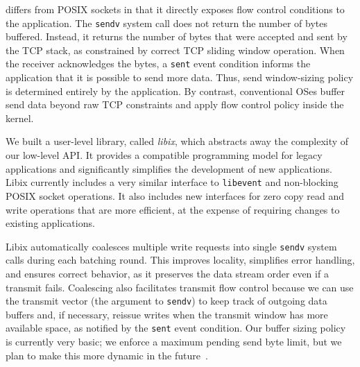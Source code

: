 \ix differs from POSIX sockets in that it directly exposes flow
control conditions to the application. The \texttt{sendv} system call
does not return the number of bytes buffered. Instead, it returns the
number of bytes that were accepted and sent by the TCP stack, as
constrained by correct TCP sliding window operation. When the receiver
acknowledges the bytes, a \texttt{sent} event condition informs the
application that it is possible to send more data. Thus, send window-sizing policy is determined entirely by the application.  By contrast,
conventional OSes buffer send data beyond raw TCP constraints and
apply flow control policy inside the kernel.


We built a user-level library, called \emph{libix}, which abstracts
away the complexity of our low-level API. It provides a compatible
programming model for legacy applications and significantly simplifies
the development of new applications. Libix currently includes a
very similar interface to \texttt{libevent} and
non-blocking POSIX socket operations. It also includes new interfaces
for zero copy read and write operations that are more efficient, at
the expense of requiring changes to existing applications.

Libix automatically coalesces multiple write requests into single
\texttt{sendv} system calls during each batching round. This improves
locality, simplifies error handling, and ensures correct behavior,
as it preserves the data stream order even if a transmit fails.
Coalescing also facilitates transmit flow control because
we can use the transmit vector (the argument to \texttt{sendv})
to keep track of outgoing data buffers and, if necessary, reissue
writes when the transmit window has more available space, as notified
by the \texttt{sent} event condition. Our buffer sizing policy is currently
very basic; we enforce a maximum pending send byte limit, but
we plan to make this more dynamic in the future~\cite{dynamicwindow}.


